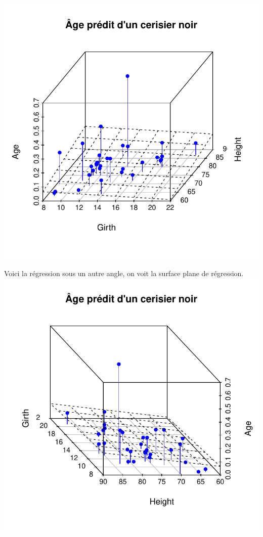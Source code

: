 \documentclass[11pt,french]{report}
\begin{document}
\includegraphics{notes_de_cours-002}

Voici la régression sous un autre angle, on voit la surface plane de régression.
\includegraphics{notes_de_cours-003}
\end{document}
